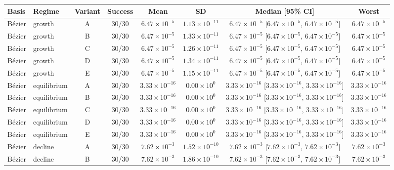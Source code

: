 \begin{tabular}{llcccccc}
\toprule
Basis & Regime & Variant & Success & Mean & SD & Median [95\% CI] & Worst\\
\midrule
B\'ezier & growth & A & 30/30 & $6.47\times10^{-5}$ & $1.13\times10^{-11}$ & $6.47\times10^{-5}$ [$6.47\times10^{-5}$, $6.47\times10^{-5}$] & $6.47\times10^{-5}$\\
B\'ezier & growth & B & 30/30 & $6.47\times10^{-5}$ & $1.33\times10^{-11}$ & $6.47\times10^{-5}$ [$6.47\times10^{-5}$, $6.47\times10^{-5}$] & $6.47\times10^{-5}$\\
B\'ezier & growth & C & 30/30 & $6.47\times10^{-5}$ & $1.26\times10^{-11}$ & $6.47\times10^{-5}$ [$6.47\times10^{-5}$, $6.47\times10^{-5}$] & $6.47\times10^{-5}$\\
B\'ezier & growth & D & 30/30 & $6.47\times10^{-5}$ & $1.34\times10^{-11}$ & $6.47\times10^{-5}$ [$6.47\times10^{-5}$, $6.47\times10^{-5}$] & $6.47\times10^{-5}$\\
B\'ezier & growth & E & 30/30 & $6.47\times10^{-5}$ & $1.15\times10^{-11}$ & $6.47\times10^{-5}$ [$6.47\times10^{-5}$, $6.47\times10^{-5}$] & $6.47\times10^{-5}$\\
B\'ezier & equilibrium & A & 30/30 & $3.33\times10^{-16}$ & $0.00\times10^{0}$ & $3.33\times10^{-16}$ [$3.33\times10^{-16}$, $3.33\times10^{-16}$] & $3.33\times10^{-16}$\\
B\'ezier & equilibrium & B & 30/30 & $3.33\times10^{-16}$ & $0.00\times10^{0}$ & $3.33\times10^{-16}$ [$3.33\times10^{-16}$, $3.33\times10^{-16}$] & $3.33\times10^{-16}$\\
B\'ezier & equilibrium & C & 30/30 & $3.33\times10^{-16}$ & $0.00\times10^{0}$ & $3.33\times10^{-16}$ [$3.33\times10^{-16}$, $3.33\times10^{-16}$] & $3.33\times10^{-16}$\\
B\'ezier & equilibrium & D & 30/30 & $3.33\times10^{-16}$ & $0.00\times10^{0}$ & $3.33\times10^{-16}$ [$3.33\times10^{-16}$, $3.33\times10^{-16}$] & $3.33\times10^{-16}$\\
B\'ezier & equilibrium & E & 30/30 & $3.33\times10^{-16}$ & $0.00\times10^{0}$ & $3.33\times10^{-16}$ [$3.33\times10^{-16}$, $3.33\times10^{-16}$] & $3.33\times10^{-16}$\\
B\'ezier & decline & A & 30/30 & $7.62\times10^{-3}$ & $1.52\times10^{-10}$ & $7.62\times10^{-3}$ [$7.62\times10^{-3}$, $7.62\times10^{-3}$] & $7.62\times10^{-3}$\\
B\'ezier & decline & B & 30/30 & $7.62\times10^{-3}$ & $1.86\times10^{-10}$ & $7.62\times10^{-3}$ [$7.62\times10^{-3}$, $7.62\times10^{-3}$] & $7.62\times10^{-3}$\\

\end{tabular}
